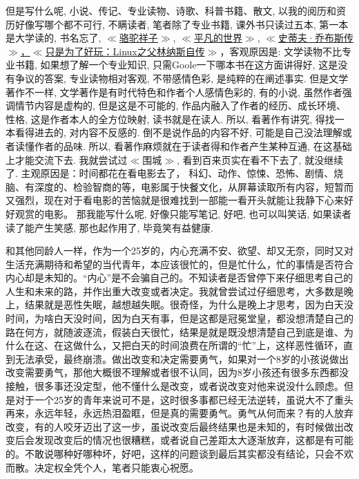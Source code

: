 \documentclass[utf8]{book}
\begin{document}
	但是写什么呢, 小说、传记、专业读物、诗歌、科普书籍、散文, 以我的阅历和资历好像写哪个都不可行, 不瞒读者, 笔者除了专业书籍, 课外书只读过五本, 第一本是大学读的, 书名忘了, \href{https://book.douban.com/subject/1043815/}{$\ll$骆驼祥子$\gg$}, \href{https://book.douban.com/subject/1200840/}{$\ll$平凡的世界$\gg$}, \href{https://book.douban.com/subject/6798611/}{$\ll$史蒂夫·乔布斯传}
	\href{https://book.douban.com/subject/25930025/}{$\gg$，$\ll$只是为了好玩：Linux之父林纳斯自传$\gg$}，客观原因是: 文学读物不比专业书籍, 如果想了解一个专业知识, 只需Goole一下哪本书在这方面讲得好, 这是没有争议的答案, 专业读物相对客观, 不带感情色彩, 是纯粹的在阐述事实. 但是文学著作不一样, 文学著作是有时代特色和作者个人感情色彩的, 有的小说, 虽然作者强调情节内容是虚构的, 但是这是不可能的, 作品内融入了作者的经历、成长环境、性格, 这是作者本人的全方位映射, 读书就是在读人. 所以, 看著作有讲究, 得找一本看得进去的, 对内容不反感的. 倒不是说作品的内容不好, 可能是自己没法理解或者读懂作者的品味. 所以, 看著作麻烦就在于读者得和作者产生某种互通, 在这基础上才能交流下去. 我就尝试过$\ll$围城$\gg$, 看到百来页实在看不下去了, 就没继续了. 主观原因是：时间都花在看电影去了， 科幻、动作、惊悚、恐怖、剧情、烧脑、有深度的、检验智商的等，电影属于快餐文化，从屏幕读取所有内容，短暂而又强烈，现在对于看电影的苦恼就是很难找到一部能一看开头就能让我静下心来好好观赏的电影。 那我能写什么呢, 好像只能写笔记, 好吧, 也可以叫笑话, 如果读者读了能产生笑感, 那也起作用了, 毕竟笑有益健康.
	
	
	和其他同龄人一样，作为一个25岁的，内心充满不安、欲望、却又无奈，同时又对生活充满期待和希望的当代青年，本应该很忙的，但是忙什么，忙的事情是否符合内心却是未知的。“内心”是不会骗自己的。不知读者是否曾停下来仔细思考自己的人生和未来的路，并作出重大改变或者决定。我就曾尝试过仔细思考，大多数是晚上，结果就是恶性失眠，越想越失眠。很奇怪，为什么是晚上才思考，因为白天没时间，为啥白天没时间，因为白天有事，但是这都是冠冕堂皇，都没想清楚自己的路在何方，就随波逐流，假装白天很忙，结果是就是既没想清楚自己到底是谁、为什么在这、在这做什么，又把白天的时间浪费在所谓的“忙”上，这样恶性循环，直到无法承受，最终崩溃。做出改变和决定需要勇气，如果对一个8岁的小孩说做出改变需要勇气，那他大概很不理解或者很不认同，因为8岁小孩还有很多东西都没接触，很多事还没定型，他不懂什么是改变，或者说改变对他来说没什么顾虑。但是对于一个25岁的青年来说可不是，这时很多事都已经无法逆转，虽说大不了重头再来，永远年轻，永远热泪盈眶，但是真的需要勇气。勇气从何而来？有的人放弃改变，有的人咬牙迈出了这一步，虽说改变后最终结果也是未知的，有时候做出改变后会发现改变后的情况也很糟糕，或者说自己差距太大逐渐放弃，这都是有可能的。不敢说哪种好哪种坏，好吧，这样的问题谈到最后其实都没有结论，只会不欢而散。决定权全凭个人，笔者只能衷心祝愿。
	
\end{document}
